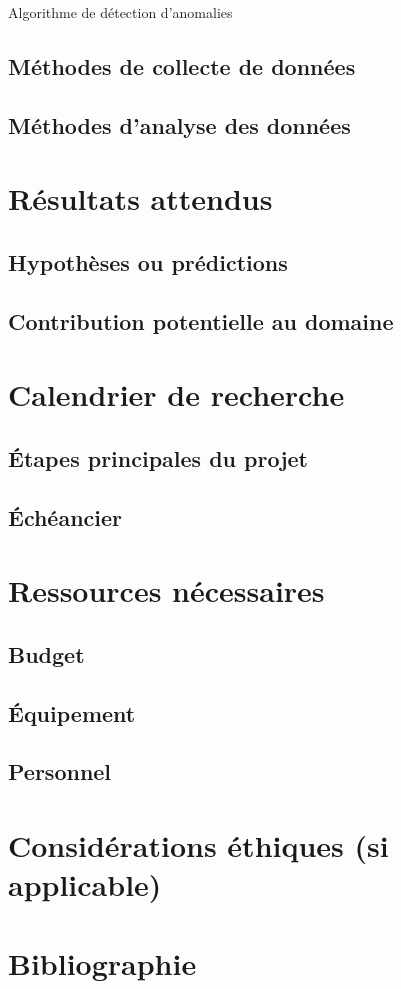 \documentclass{article}
\begin{document}
Algorithme de détection d’anomalies

\subsection{Méthodes de collecte de données}
\subsection{Méthodes d'analyse des données}

\section{Résultats attendus}

\subsection{Hypothèses ou prédictions}
\subsection{Contribution potentielle au domaine}
\section{Calendrier de recherche}
\subsection{Étapes principales du projet}
\subsection{Échéancier}

\section{Ressources nécessaires}
\subsection{Budget}
\subsection{Équipement}
\subsection{Personnel}
\section{Considérations éthiques (si applicable)}
\section{Bibliographie}
\end{document}

